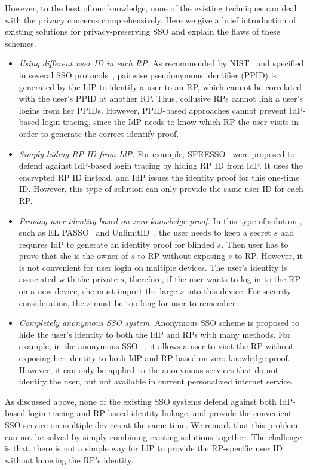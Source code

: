 However, to the best of our knowledge, none of the existing techniques can deal with the privacy concerns comprehensively. Here we give a brief introduction of existing solutions for privacy-preserving SSO and explain the flaws of these schemes. 
\begin{itemize}
\item {\em Using different user ID in each RP. }As recommended by NIST~\cite{NIST2017draft} and specified in several SSO protocols~\cite{OpenIDConnect, SAMLIdentifier}, pairwise pseudonymous identifier (PPID) is generated by the IdP to identify a user to an RP, which cannot be correlated with the user's PPID at another RP. Thus, collusive RPs cannot link a user's logins from her PPIDs. However, PPID-based approaches cannot prevent IdP-based login tracing, since the IdP needs to know which RP the user visits in order to generate the correct identify proof.
\item {\em Simply hiding RP ID from IdP. }For example, SPRESSO~\cite{SPRESSO} were proposed to defend against IdP-based login tracing by hiding RP ID from IdP. It uses the encrypted RP ID instead, and IdP issues the identity proof for this one-time ID. However, this type of solution can only provide the same user ID for each RP.
\item {\em Proving user identity based on zero-knowledge proof. }In this type of solution , such as EL PASSO~\cite{ZhangKSZR21} and UnlimitID~\cite{IsaakidisHD16}, the user needs to keep a secret $s$ and requires IdP to generate an identity proof for blinded $s$. Then user has to prove that she is the owner of $s$ to RP without exposing $s$ to RP. However, it is not convenient for user login on multiple devices. The user's identity is associated with the private $s$, therefore, if the user wants to log in to the RP on a new device, she must import the large $s$ into this device. For security consideration, the $s$ must be too long for user to remember. 
\item {\em Completely anonymous SSO system. }Anonymous SSO scheme is proposed to hide the user's identity to both the IdP and RPs with many methods. For example, in the anonymous SSO ~\cite{HanCSTW18}, it allows a user to visit the RP without exposing her identity to both IdP and RP based on zero-knowledge proof. However, it can only be applied to the anonymous services that do not identify the user, but not available in current personalized internet service.
\end{itemize}


As discussed above, none of the existing SSO systems defend against both IdP-based login tracing and RP-based identity linkage, and provide the convenient SSO service on multiple devices at the same time.
We remark that this problem can not be solved by simply combining existing solutions together. The challenge is that, there is not a simple way for IdP to provide the RP-specific user ID without knowing the RP's identity.

